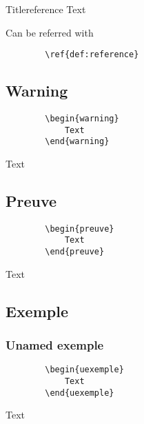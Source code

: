 \documentclass[french]{article}
\begin{document}
    \begin{definition}{Title}{reference}
        Text
    \end{definition}

    Can be referred with 
    \begin{verbatim} 
        \ref{def:reference}
    \end{verbatim}

    \subsection{Warning}

    \begin{verbatim}
        \begin{warning}
            Text
        \end{warning}
    \end{verbatim}

    \begin{warning}
        Text
    \end{warning}

    \subsection{Preuve}

    \begin{verbatim}
        \begin{preuve}
            Text
        \end{preuve}
    \end{verbatim}

    \begin{preuve}
        Text
    \end{preuve}

    \subsection{Exemple}

    \subsubsection{Unamed exemple}

    \begin{verbatim}
        \begin{uexemple}
            Text
        \end{uexemple}
    \end{verbatim}
    
    \begin{uexemple}
        Text
    \end{uexemple}
\end{document}
